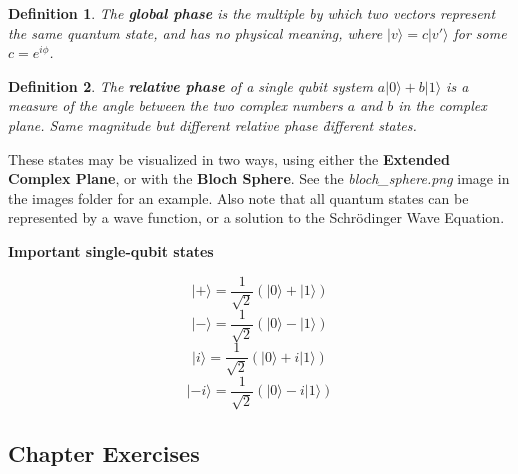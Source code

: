 \documentclass[12pt]{article}
\theoremstyle{mytheor}
\newtheorem{defi}{Definition}
\begin{document}
\begin{defi}
The \textbf{global phase} is the multiple by which two vectors represent the same quantum state, and has no physical meaning, where \(|v\rangle = c|v'\rangle\) for some \(c=e^{i\phi}\).
\end{defi}

\begin{defi}
The \textbf{relative phase} of a single qubit system \(a|0\rangle + b|1\rangle\) is a measure of the angle between the two complex numbers $a$ and $b$ in the complex plane. Same magnitude but different relative phase \= different states.
\end{defi}

These states may be visualized in two ways, using either the \textbf{Extended Complex Plane}, or with the \textbf{Bloch Sphere}. See the \textit{bloch\_sphere.png} image in the images folder for an example. Also note that all quantum states can be represented by a wave function, or a solution to the Schr\"odinger Wave Equation.

\textbf{Important single-qubit states}

$$|+\rangle = \frac{1}{\sqrt{2}}(|0\rangle + |1\rangle)$$
$$|-\rangle = \frac{1}{\sqrt{2}}(|0\rangle - |1\rangle)$$
$$|i\rangle = \frac{1}{\sqrt{2}}(|0\rangle + i|1\rangle)$$
$$|-i\rangle = \frac{1}{\sqrt{2}}(|0\rangle - i|1\rangle)$$

\subsection{Chapter Exercises}
\end{document}
